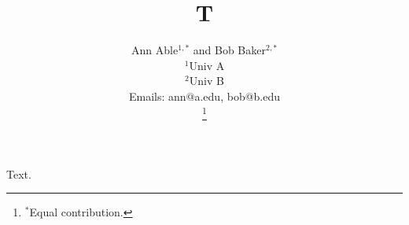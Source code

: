 \documentclass{article}
\title{T}
\author{Ann Able$^{1,*}$ and Bob Baker$^{2,*}$\\
$^{1}$Univ A\\
$^{2}$Univ B\\
Emails: ann@a.edu, bob@b.edu\\
\thanks{$^{*}$Equal contribution.}}
\begin{document}
\maketitle
Text.
\end{document}
